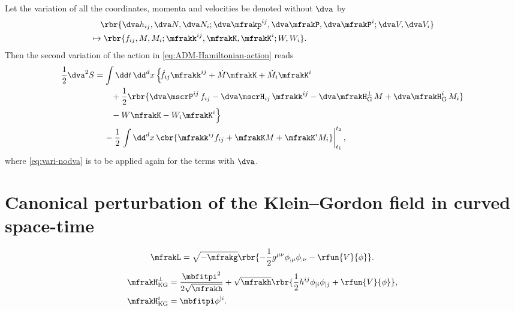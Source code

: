 \documentclass[a4paper,11pt]{article}
\begin{document}
Let the variation of all the coordinates, momenta and velocities be denoted 
without $\dva$ by
\begin{align}
&\quad\,
\rbr{\dva h_{ij}, \dva N, \dva N_i; \dva\mfrakp^{ij}, \dva\mfrakP, 
\dva\mfrakP^i; \dva V, \dva V_i}
\nonumber \\
&\mapsto
\rbr{f_{ij}, M, M_i; \mfrakk^{ij}, \mfrakK, \mfrakK^i; W, W_i}.
\label{eq:vari-nodva}
\end{align}
Then the second variation of the action in \cref{eq:ADM-Hamiltonian-action} 
reads
\begin{align}
\frac{1}{2} \dva^2 S &= \int \dd t\,\dd^d x\,\Big\{\!
\dot f_{ij} \mfrakk^{ij} +\dot M \mfrakK+ \dot{M}_i \mfrakK^i
\nonumber \\
&\qquad
+\frac{1}{2}\rbr{
\dva\mscrP^{ij} \, f_{ij}
-\dva\mscrH_{ij} \, \mfrakk^{ij}
-\dva\mfrakH^\perp_\text{G} \, M
+\dva\mfrakH^i_\text{G} \, M_i}
\nonumber \\
&\qquad
-W \mfrakK - W_i \mfrakK^i \Big\}
\nonumber \\
&\quad\,
-\frac{1}{2}\left.\int\dd^d x\,
\cbr{\mfrakk^{ij} f_{ij} + \mfrakK M + \mfrakK^i M_i}\right|_{t_1}^{t_2},
\end{align}
where \cref{eq:vari-nodva} is to be applied again for the terms with $\dva$.

\section{Canonical perturbation of the Klein--Gordon field in curved space-time}


\begin{align}
\mfrakL = \sqrt{-\mfrakg}\rbr{-\frac{1}{2}g^{\mu\nu}\phi_{;\mu}\phi_{;\nu}
-\rfun{V}{\phi}}.
\end{align}
\cite[ch.\ 4.2.2]{Kiefer2012}
\begin{align}
\mfrakH^\perp_\text{KG} &= \frac{\mbfitpi^2}{2\sqrt{\mfrakh}} + \sqrt{\mfrakh}
\rbr{\frac{1}{2}h^{ij}\phi_{|i}\phi_{|j}+\rfun{V}{\phi}},\\
\mfrakH^i_\text{KG} &= \mbfitpi \phi^{|i}.
\end{align}
\end{document}
